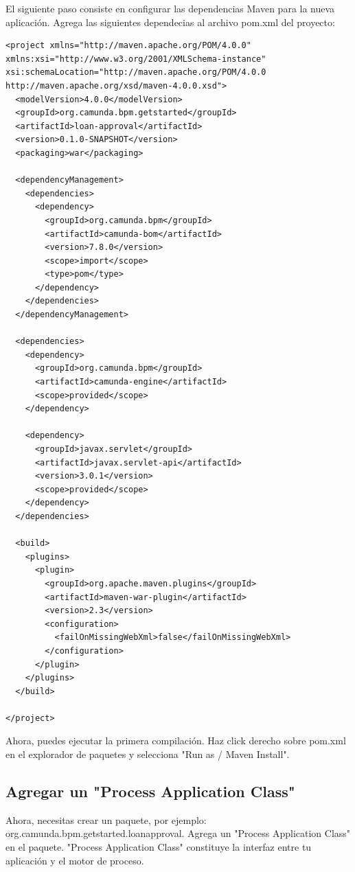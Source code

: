 \documentclass{article}
\begin{document}
El siguiente paso consiste en configurar las dependencias Maven para la nueva aplicación. Agrega las siguientes dependecias al archivo pom.xml del proyecto:

\begin{verbatim}
<project xmlns="http://maven.apache.org/POM/4.0.0" 
xmlns:xsi="http://www.w3.org/2001/XMLSchema-instance"
xsi:schemaLocation="http://maven.apache.org/POM/4.0.0 
http://maven.apache.org/xsd/maven-4.0.0.xsd">
  <modelVersion>4.0.0</modelVersion>
  <groupId>org.camunda.bpm.getstarted</groupId>
  <artifactId>loan-approval</artifactId>
  <version>0.1.0-SNAPSHOT</version>
  <packaging>war</packaging>

  <dependencyManagement>
    <dependencies>
      <dependency>
        <groupId>org.camunda.bpm</groupId>
        <artifactId>camunda-bom</artifactId>
        <version>7.8.0</version>
        <scope>import</scope>
        <type>pom</type>
      </dependency>
    </dependencies>
  </dependencyManagement>

  <dependencies>
    <dependency>
      <groupId>org.camunda.bpm</groupId>
      <artifactId>camunda-engine</artifactId>
      <scope>provided</scope>
    </dependency>

    <dependency>
      <groupId>javax.servlet</groupId>
      <artifactId>javax.servlet-api</artifactId>
      <version>3.0.1</version>
      <scope>provided</scope>
    </dependency>
  </dependencies>

  <build>
    <plugins>
      <plugin>
        <groupId>org.apache.maven.plugins</groupId>
        <artifactId>maven-war-plugin</artifactId>
        <version>2.3</version>
        <configuration>
          <failOnMissingWebXml>false</failOnMissingWebXml>
        </configuration>
      </plugin>
    </plugins>
  </build>

</project>
\end{verbatim}

Ahora, puedes ejecutar la primera compilación. Haz click derecho sobre pom.xml en el explorador de paquetes y selecciona "Run as / Maven Install".


\subsection{Agregar un "Process Application Class"}%

Ahora, necesitas crear un paquete, por ejemplo:\\
org.camunda.bpm.getstarted.loanapproval. Agrega un "Process Application Class" en el paquete. "Process Application Class" constituye la interfaz entre tu aplicación y el motor de proceso.
\end{document}
